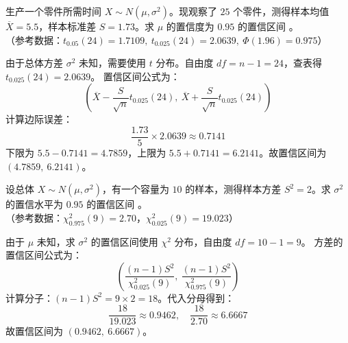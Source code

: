\documentclass[lang=cn,11pt]{elegantbook}
\begin{document}
\begin{exercise} \label{prob:ci_2}
生产一个零件所需时间 $X \sim N(\mu, \sigma^2)$。现观察了 $25$ 个零件，测得样本均值 $\overline{X}=5.5$，样本标准差 $S=1.73$。求 $\mu$ 的置信度为 $0.95$ 的置信区间 \underline{\qquad\qquad}。\\
（参考数据：$t_{0.05}(24)=1.7109,\ t_{0.025}(24)=2.0639,\ \Phi(1.96)=0.975$）
\end{exercise}
\begin{solution}
由于总体方差 $\sigma^2$ 未知，需要使用 $t$ 分布。自由度 $df = n-1 = 24$，查表得 $t_{0.025}(24)=2.0639$。
置信区间公式为：
\begin{equation*}
\left( \overline{X}-\frac{S}{\sqrt{n}}t_{0.025}(24),\ \overline{X}+\frac{S}{\sqrt{n}}t_{0.025}(24) \right)
\end{equation*}
计算边际误差：
\begin{equation*}
\frac{1.73}{5} \times 2.0639 \approx 0.7141
\end{equation*}
下限为 $5.5 - 0.7141 = 4.7859$，上限为 $5.5 + 0.7141 = 6.2141$。故置信区间为 $(4.7859,\ 6.2141)$。
\end{solution}

\begin{exercise} \label{prob:ci_3}
设总体 $X \sim N(\mu, \sigma^2)$，有一个容量为 $10$ 的样本，测得样本方差 $S^2=2$。求 $\sigma^2$ 的置信水平为 $0.95$ 的置信区间 \underline{\qquad\qquad}。\\
（参考数据：$\chi^2_{0.975}(9)=2.70$，$\chi^2_{0.025}(9)=19.023$）
\end{exercise}
\begin{solution}
由于 $\mu$ 未知，求 $\sigma^2$ 的置信区间使用 $\chi^2$ 分布，自由度 $df = 10-1 = 9$。
方差的置信区间公式为：
\begin{equation*}
\left( \frac{(n-1)S^2}{\chi^2_{0.025}(9)},\ \frac{(n-1)S^2}{\chi^2_{0.975}(9)} \right)
\end{equation*}
计算分子：$(n-1)S^2 = 9 \times 2 = 18$。代入分母得到：
\begin{equation*}
\frac{18}{19.023} \approx 0.9462,\quad \frac{18}{2.70} \approx 6.6667
\end{equation*}
故置信区间为 $(0.9462,\ 6.6667)$。
\end{solution}
\end{document}
